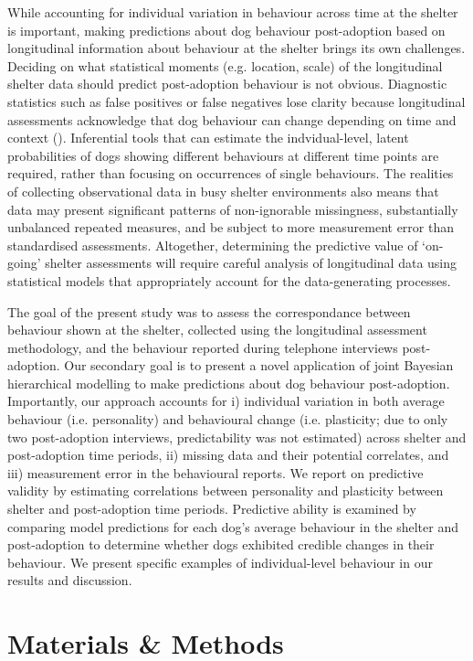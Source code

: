 \documentclass[12pt]{article}
\begin{document}
While accounting for individual variation in behaviour across time at the shelter is important, making predictions about dog behaviour post-adoption based on longitudinal information about behaviour at the shelter brings its own challenges. Deciding on what statistical moments (e.g. location, scale) of the longitudinal shelter data should predict post-adoption behaviour is not obvious. Diagnostic statistics such as false positives or false negatives lose clarity because longitudinal assessments acknowledge that dog behaviour can change depending on time and context (\cite{goold2017modelling}). Inferential tools that can estimate the indvidual-level, latent probabilities of dogs showing different behaviours at different time points are required, rather than focusing on occurrences of single behaviours. The realities of collecting observational data in busy shelter environments also means that data may present significant patterns of non-ignorable missingness, substantially unbalanced repeated measures, and be subject to more measurement error than standardised assessments. Altogether, determining the predictive value of `on-going' shelter assessments will require careful analysis of longitudinal data using statistical models that appropriately account for the data-generating processes.

The goal of the present study was to assess the correspondance between behaviour shown at the shelter, collected using the longitudinal assessment methodology, and the behaviour reported during telephone interviews post-adoption. Our secondary goal is to present a novel application of joint Bayesian hierarchical modelling to make predictions about dog behaviour post-adoption. Importantly, our approach accounts for i) individual variation in both average behaviour (i.e. personality) and behavioural change (i.e. plasticity; due to only two post-adoption interviews, predictability was not estimated) across shelter and post-adoption time periods, ii) missing data and their potential correlates, and iii) measurement error in the behavioural reports. We report on predictive validity by estimating correlations between personality and plasticity between shelter and post-adoption time periods. Predictive ability is examined by comparing model predictions for each dog's average behaviour in the shelter and post-adoption to determine whether dogs exhibited credible changes in their behaviour. We present specific examples of individual-level behaviour in our results and discussion.

\section{Materials \& Methods}
\end{document}
